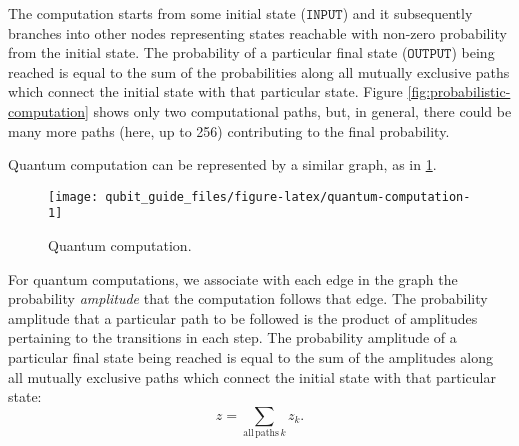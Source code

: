 \documentclass[fleqn]{article}
\begin{document}
The computation starts from some initial state (\(\texttt{INPUT}\)) and it subsequently branches into other nodes representing states reachable with non-zero probability from the initial state.
The probability of a particular final state (\(\texttt{OUTPUT}\)) being reached is equal to the sum of the probabilities along all mutually exclusive paths which connect the initial state with that particular state.
Figure \ref{fig:probabilistic-computation} shows only two computational paths, but, in general, there could be many more paths (here, up to 256) contributing to the final probability.

Quantum computation can be represented by a similar graph, as in \ref{fig:quantum-computation}.

\begin{figure}[H]

{\centering \texttt{[image: qubit\_guide\_files/figure-latex/quantum-computation-1]} 

}

\caption{Quantum computation.}\label{fig:quantum-computation}
\end{figure}

For quantum computations, we associate with each edge in the graph the probability \emph{amplitude} that the computation follows that edge.
The probability amplitude that a particular path to be followed is the product of amplitudes pertaining to the transitions in each step.
The probability amplitude of a particular final state being reached is equal to the sum of the amplitudes along all mutually exclusive paths which connect the initial state with that particular state:
\[
  z = \sum_{\mathrm{all\,paths}\,k} z_k.
\]
\end{document}
